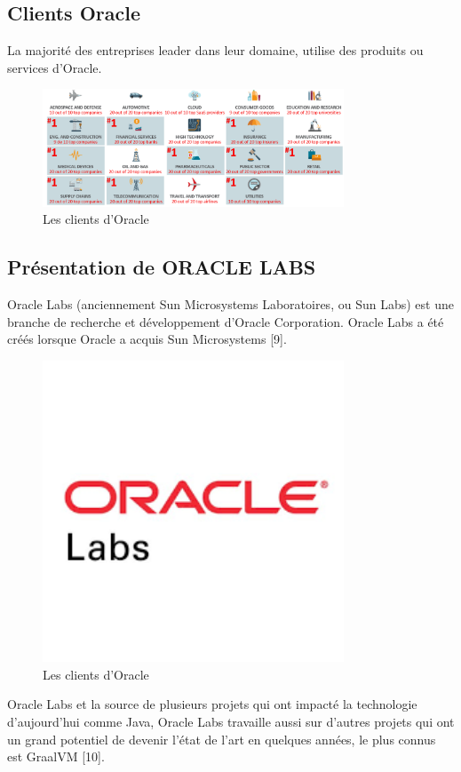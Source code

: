 \subsection{Clients Oracle}
La majorité des entreprises leader dans leur domaine, utilise des produits ou services d’Oracle.
\begin{figure}[h!]  
  \centering
    \includegraphics[width=0.8\textwidth]{chapitre1/Figures/OracleCustumers.PNG}
  \caption{Les clients d'Oracle}
\end{figure}

\subsection{Présentation de ORACLE LABS}
Oracle Labs (anciennement Sun Microsystems Laboratoires, ou Sun Labs) est une branche de recherche et développement d'Oracle Corporation. Oracle Labs a été créés lorsque Oracle a acquis Sun Microsystems [9].\\
\begin{figure}[h!]  
  \centering
    \includegraphics[width=0.8\textwidth]{chapitre1/Figures/OracleLabs.png}
  \caption{Les clients d'Oracle}
\end{figure}
Oracle Labs et la source de plusieurs projets qui ont impacté la technologie d’aujourd’hui comme Java, Oracle Labs travaille aussi sur d’autres projets qui ont un grand potentiel de devenir l'état de l'art en quelques années, le plus connus est GraalVM [10].\\

